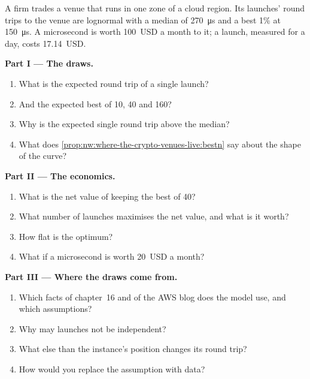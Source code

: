 \begin{problem}\label{pb:nw:where-the-crypto-venues-live:1}
A firm trades a venue that runs in one zone of a cloud region. Its launches' round trips to the venue are lognormal with a median of
\qty{270}{\micro\second} and a best 1\% at \qty{150}{\micro\second}. A microsecond is worth 100~USD a month to it; a launch, measured for a day, costs
17.14~USD.

\medskip\noindent\textbf{Part I --- The draws.}
\begin{enumerate}
\item What is the expected round trip of a single launch?
\item And the expected best of 10, 40 and 160?
\item Why is the expected single round trip above the median?
\item What does \cref{prop:nw:where-the-crypto-venues-live:bestn} say about the shape of the curve?
\end{enumerate}

\medskip\noindent\textbf{Part II --- The economics.}
\begin{enumerate}[resume]
\item What is the net value of keeping the best of 40?
\item What number of launches maximises the net value, and what is it worth?
\item How flat is the optimum?
\item What if a microsecond is worth 20~USD a month?
\end{enumerate}

\medskip\noindent\textbf{Part III --- Where the draws come from.}
\begin{enumerate}[resume]
\item Which facts of chapter~16 and of the AWS blog does the model use, and which assumptions?
\item Why may launches not be independent?
\item What else than the instance's position changes its round trip?
\item How would you replace the assumption with data?
\end{enumerate}


\end{problem}
